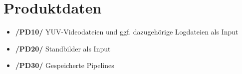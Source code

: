 \section{Produktdaten}

\begin{itemize}
	\item \textbf{/PD10/} YUV-Videodateien und ggf. dazugehörige Logdateien als Input
	\item \textbf{/PD20/} Standbilder als Input
	\item \textbf{/PD30/} Gespeicherte Pipelines
\end{itemize}
